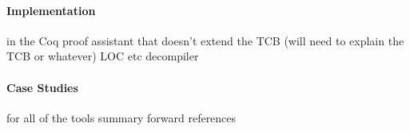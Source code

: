 \paragraph{Implementation}
\sysname
in the Coq proof assistant that doesn't extend the TCB (will need to explain the TCB or whatever)
LOC etc
decompiler

\paragraph{Case Studies}
for all of the tools
summary
forward references



